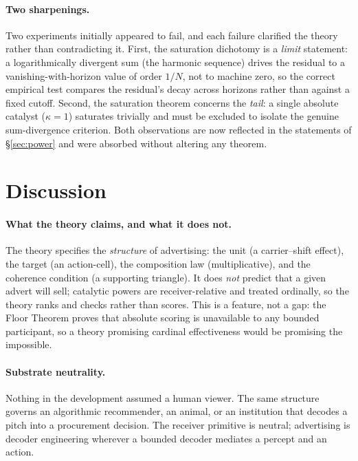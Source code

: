 \documentclass[twocolumn,11pt,a4paper]{article}
\theoremstyle{adv}
\theoremstyle{definition}
\theoremstyle{remark}
\newcommand{\pot}{\kappa}             %
\begin{document}
\paragraph{Two sharpenings.}
Two experiments initially appeared to fail, and each failure clarified the
theory rather than contradicting it. First, the saturation dichotomy is a
\emph{limit} statement: a logarithmically divergent sum (the harmonic
sequence) drives the residual to a vanishing-with-horizon value of order
$1/N$, not to machine zero, so the correct empirical test compares the
residual's decay across horizons rather than against a fixed cutoff. Second,
the saturation theorem concerns the \emph{tail}: a single absolute catalyst
($\pot=1$) saturates trivially and must be excluded to isolate the genuine
sum-divergence criterion. Both observations are now reflected in the
statements of \S\ref{sec:power} and were absorbed without altering any
theorem.

\section{Discussion}
\label{sec:discussion}

\paragraph{What the theory claims, and what it does not.}
The theory specifies the \emph{structure} of advertising: the unit (a
carrier--shift effect), the target (an action-cell), the composition law
(multiplicative), and the coherence condition (a supporting triangle). It
does \emph{not} predict that a given advert will sell; catalytic powers are
receiver-relative and treated ordinally, so the theory ranks and checks
rather than scores. This is a feature, not a gap: the Floor Theorem proves
that absolute scoring is unavailable to any bounded participant, so a
theory promising cardinal effectiveness would be promising the impossible.

\paragraph{Substrate neutrality.}
Nothing in the development assumed a human viewer. The same structure
governs an algorithmic recommender, an animal, or an institution that
decodes a pitch into a procurement decision. The receiver primitive is
neutral; advertising is decoder engineering wherever a bounded decoder
mediates a percept and an action.
\end{document}
